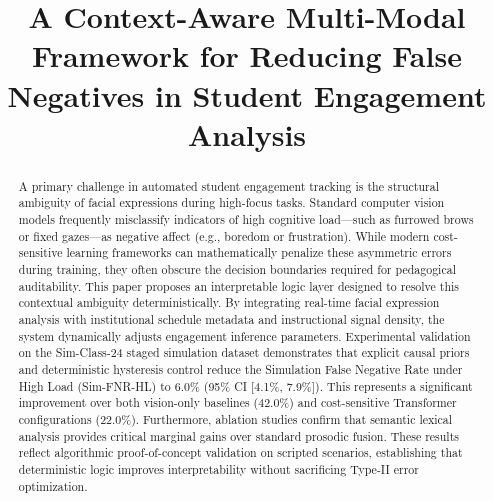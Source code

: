 \documentclass[conference]{IEEEtran}
\begin{document}
\title{A Context-Aware Multi-Modal Framework for Reducing False Negatives in Student Engagement Analysis}

\author{
}

\maketitle

\begin{abstract}
A primary challenge in automated student engagement tracking is the structural ambiguity of facial expressions during high-focus tasks. Standard computer vision models frequently misclassify indicators of high cognitive load—such as furrowed brows or fixed gazes—as negative affect (e.g., boredom or frustration). While modern cost-sensitive learning frameworks can mathematically penalize these asymmetric errors during training, they often obscure the decision boundaries required for pedagogical auditability. This paper proposes an interpretable logic layer designed to resolve this contextual ambiguity deterministically. By integrating real-time facial expression analysis with institutional schedule metadata and instructional signal density, the system dynamically adjusts engagement inference parameters. Experimental validation on the Sim-Class-24 staged simulation dataset demonstrates that explicit causal priors and deterministic hysteresis control reduce the Simulation False Negative Rate under High Load (Sim-FNR-HL) to 6.0\% (95\% CI [4.1\%, 7.9\%]). This represents a significant improvement over both vision-only baselines (42.0\%) and cost-sensitive Transformer configurations (22.0\%). Furthermore, ablation studies confirm that semantic lexical analysis provides critical marginal gains over standard prosodic fusion. These results reflect algorithmic proof-of-concept validation on scripted scenarios, establishing that deterministic logic improves interpretability without sacrificing Type-II error optimization.
\end{abstract}
\end{document}
